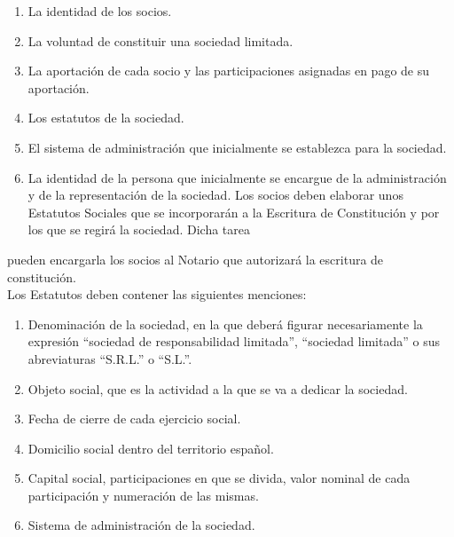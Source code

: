 \begin{enumerate}
\item La identidad de los socios.
\item La voluntad de constituir una sociedad limitada.
\item La aportación de cada socio y las participaciones asignadas en pago de su aportación.
\item Los estatutos de la sociedad.
\item El sistema de administración que inicialmente se establezca para la sociedad.
\item La identidad de la persona que inicialmente se encargue de la administración y de la representación de la sociedad.
Los socios deben elaborar unos Estatutos Sociales que se incorporarán a la Escritura de Constitución y por los que se regirá la sociedad. Dicha tarea
\end{enumerate}
pueden encargarla los socios al Notario que autorizará la escritura de constitución.\\
Los Estatutos deben contener las siguientes menciones:
\begin{enumerate}
\item Denominación de la sociedad, en la que deberá figurar necesariamente la expresión “sociedad de responsabilidad limitada”, “sociedad limitada” o sus abreviaturas “S.R.L.” o “S.L.”.
\item Objeto social, que es la actividad a la que se va a dedicar la sociedad.
\item Fecha de cierre de cada ejercicio social.
\item Domicilio social dentro del territorio español.
\item Capital social, participaciones en que se divida, valor nominal de cada participación y numeración de las mismas.
\item Sistema de administración de la sociedad.
\end{enumerate}

